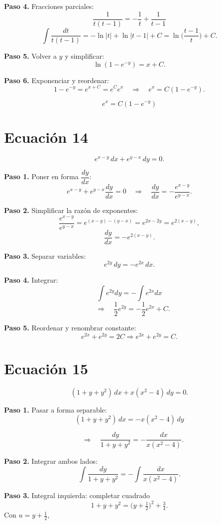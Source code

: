 \documentclass[12pt,a4paper]{article}
\begin{document}
\begin{multicols}{2}
	\textbf{Paso 4.} Fracciones parciales:
	\[
	\frac{1}{t(t-1)}=-\frac{1}{t}+\frac{1}{t-1}
	\]
	\[
	\int\frac{dt}{t(t-1)}=-\ln|t|+\ln|t-1|+C=\ln\!\Big(\frac{t-1}{t}\Big)+C.
	\]
	
	\textbf{Paso 5.} Volver a \(y\) y simplificar:
	\[
	\ln(1-e^{-y})=x+C.
	\]
	
	\textbf{Paso 6.} Exponenciar y reordenar:
	\[
	1-e^{-y}=e^{x+C}=e^{C}e^{x}\quad\Rightarrow\quad e^{x}=C(1-e^{-y}).
	\]
	
	\[
	\boxed{e^{x}=C(1-e^{-y})}
	\]
	
	\section*{Ecuación 14}
	\[
	e^{x-y}\,dx+e^{y-x}\,dy=0.
	\]
	
	\textbf{Paso 1.} Poner en forma \(\dfrac{dy}{dx}\):
	\[
	e^{x-y}+e^{y-x}\frac{dy}{dx}=0
	\quad\Rightarrow\quad
	\frac{dy}{dx}=-\frac{e^{x-y}}{e^{y-x}}.
	\]
	
	\textbf{Paso 2.} Simplificar la razón de exponentes:
	\[
	\frac{e^{x-y}}{e^{y-x}}=e^{(x-y)-(y-x)}=e^{2x-2y}=e^{2(x-y)},
	\]
	\[
	\frac{dy}{dx}=-e^{2(x-y)}.
	\]
	
	\textbf{Paso 3.} Separar variables:
	\[
	e^{2y}\,dy=-e^{2x}\,dx.
	\]
	
	\textbf{Paso 4.} Integrar:
	\[
	\int e^{2y}dy=-\int e^{2x}dx
	\]
	\[
	\quad\Rightarrow\quad
	\frac{1}{2}e^{2y}=-\frac{1}{2}e^{2x}+C.
	\]
	
	\textbf{Paso 5.} Reordenar y renombrar constante:
	\[
	e^{2x}+e^{2y}=2C \Rightarrow \boxed{e^{2x}+e^{2y}=C.}
	\]
	
	\section*{Ecuación 15}
	\[
	(1+y+y^{2})\,dx + x(x^{2}-4)\,dy = 0.
	\]
	
	\textbf{Paso 1.} Pasar a forma separable:
	\[
	(1+y+y^{2})\,dx = -x(x^{2}-4)\,dy
	\]

  \[
	\quad\Rightarrow\quad
	\frac{dy}{1+y+y^{2}} = -\frac{dx}{x(x^{2}-4)}.\]
	
	\textbf{Paso 2.} Integrar ambos lados:
	\[
	\int\frac{dy}{1+y+y^{2}} = -\int\frac{dx}{x(x^{2}-4)}.
	\]
	
	\textbf{Paso 3.} Integral izquierda: completar cuadrado
	\[
	1+y+y^{2}=\Big(y+\tfrac{1}{2}\Big)^{2}+\tfrac{3}{4}.
	\]
	Con \(u=y+\tfrac{1}{2}\),
	

\end{multicols}
\end{document}
